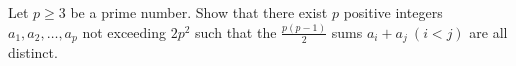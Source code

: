 Let $p\ge 3$ be a prime number. Show that there exist $p$ positive integers $a_1,a_2,\ldots ,a_p$ not exceeding $2p^2$ such that the $\frac{p(p-1)}{2}$ sums $a_i+a_j\ (i<j)$ are all distinct.